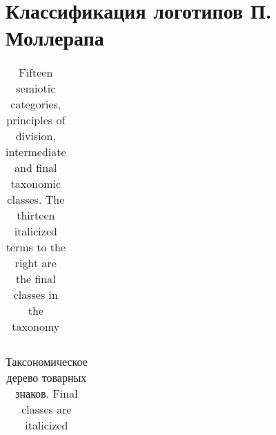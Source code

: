 \section{Классификация логотипов П. Моллерапа}
\label{app:mollerup}

\begin{table}
  \centering
  \begin{tabular}{|l|}
  \end{tabular}
  \caption{Fifteen semiotic categories, principles of division, intermediate and final taxonomic
    classes. The thirteen italicized terms to the right are the final classes in the taxonomy}
  \label{tab:mollerup1}
\end{table}

\begin{table}
  \centering
  \begin{tabular}{|l|}
  \end{tabular}
  \caption{Таксономическое дерево товарных знаков. Final classes are italicized}
  \label{tab:mollerup2}
\end{table}
